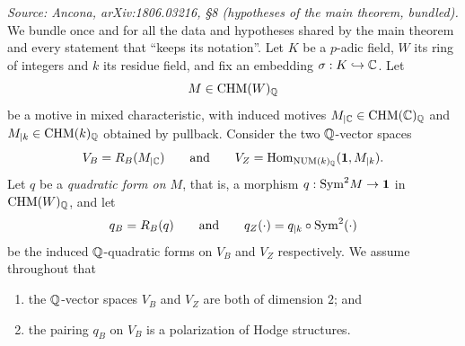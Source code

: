 \begin{definition}
  \label{def:mainthm-setup}
  \textit{Source: Ancona, arXiv:1806.03216, §8 (hypotheses of the main theorem, bundled).}
  We bundle once and for all the data and hypotheses shared by the main theorem
  and every statement that ``keeps its notation''. Let \(K\) be a \(p\)-adic
  field, \(W\) its ring of integers and \(k\) its residue field, and fix an
  embedding \(\sigma : K \hookrightarrow \mathbb{C}\). Let
  \[M \in \mathrm{CHM}(W)_{\mathbb{Q}}\]
  be a motive in mixed characteristic, with induced motives
  \(M_{\vert\mathbb{C}} \in \mathrm{CHM}(\mathbb{C})_{\mathbb{Q}}\) and \(M_{\vert{k}} \in \mathrm{CHM}(k)_{\mathbb{Q}}\) obtained by
  pullback. Consider the two \(\mathbb{Q}\)-vector spaces
  \[V_B = R_B(M_{\vert\mathbb{C}}) \qquad \text{and} \qquad
    V_Z = \mathrm{Hom}_{\mathrm{NUM}(k)_{\mathbb{Q}}}(\mathbf{1}, M_{\vert{k}}).\]
  Let \(q\) be a \emph{quadratic form on \(M\)}, that is, a morphism
  \(q : \mathrm{Sym}^2 M \to \mathbf{1}\) in \(\mathrm{CHM}(W)_{\mathbb{Q}}\), and let
  \[q_B = R_B(q) \qquad \text{and} \qquad
    q_Z(\cdot) = q_{\vert{k}} \circ \mathrm{Sym}^2(\cdot)\]
  be the induced \(\mathbb{Q}\)-quadratic forms on \(V_B\) and \(V_Z\) respectively. We
  assume throughout that
  \begin{enumerate}
    \item the \(\mathbb{Q}\)-vector spaces \(V_B\) and \(V_Z\) are both of dimension
      \(2\); and
    \item the pairing \(q_B\) on \(V_B\) is a polarization of Hodge structures.
  \end{enumerate}
\end{definition}

